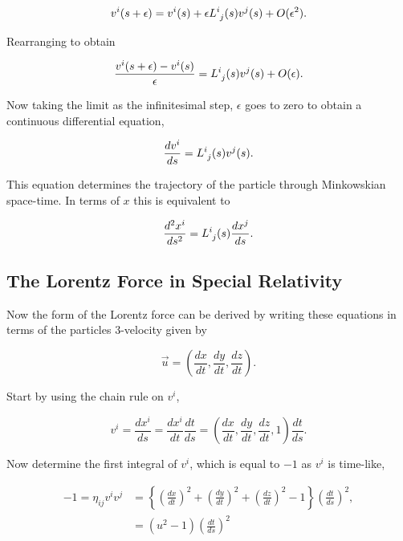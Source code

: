 \begin{equation}
v^i(s+\epsilon) = v^i(s) + \epsilon \tensor{L}{^{i}_{j}}(s)v^j (s) + O(\epsilon^2).
\end{equation}

\noindent Rearranging to obtain

\begin{equation}
\frac{v^i(s+\epsilon) - v^i(s)}{\epsilon} = \tensor{L}{^{i}_{j}}(s)v^j (s) + O(\epsilon).
\end{equation}

\noindent Now taking the limit as the infinitesimal step, $\epsilon$ goes to zero to obtain a continuous differential equation,

\begin{equation}\label{Infinitesimal_DE_interms_v}
\frac{dv^i}{ds} = \tensor{L}{^{i}_{j}}(s) v^j (s).
\end{equation}

\noindent This equation determines the trajectory of the particle through Minkowskian space-time. In terms of $x$ this is equivalent to

\begin{equation*}
\frac{d^2 x^i}{ds^2} = \tensor{L}{^{i}_{j}}(s) \frac{d x^j}{ds}.
\end{equation*}

\subsection{The Lorentz Force in Special Relativity}

Now the form of the Lorentz force can be derived by writing these equations in terms of the particles $3$-velocity given by

\begin{equation*}
\vec{u} = \left( \frac{dx}{dt}, \frac{dy}{dt}, \frac{dz}{dt} \right).
\end{equation*}

\noindent Start by using the chain rule on $v^i$,

\begin{equation}\label{Infinitesimal_Chain_Rule}
v^i = \frac{dx^i}{ds} = \frac{dx^i}{dt} \frac{dt}{ds} = \left(\frac{dx}{dt},\frac{dy}{dt},\frac{dz}{dt},1\right) \frac{dt}{ds}.
\end{equation}

\noindent Now determine the first integral of $v^i$, which is equal to $-1$ as $v^i$ is time-like,

\begin{align*} 
-1 = \eta_{ij} v^i v^j & =  \left\{ \left( \frac{dx}{dt} \right)^2  + \left( \frac{dy}{dt} \right)^2  + \left( \frac{dz}{dt} \right)^2 - 1  \right\} \left( \frac{dt}{ds} \right)^2,\\
& = (u^2 - 1)\left(\frac{dt}{ds}\right)^2
\end{align*} 

